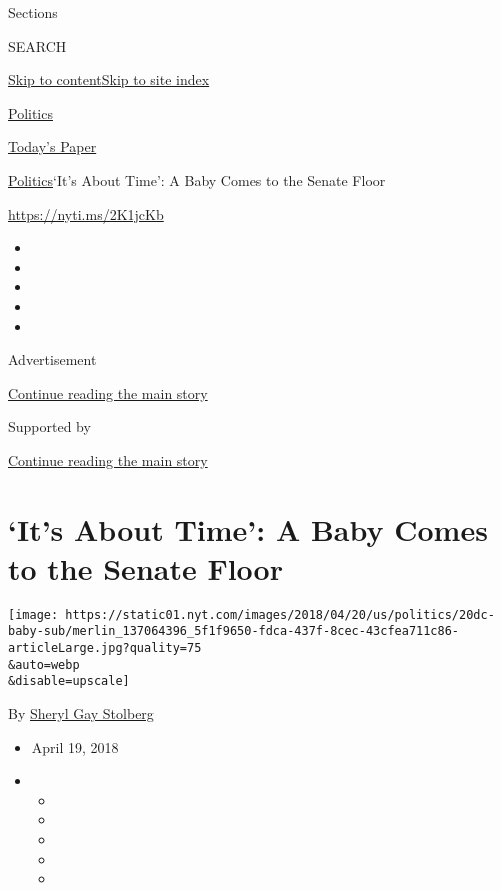 Sections

SEARCH

\protect\hyperlink{site-content}{Skip to
content}\protect\hyperlink{site-index}{Skip to site index}

\href{https://www.nytimes.com/section/politics}{Politics}

\href{https://myaccount.nytimes.com/auth/login?response_type=cookie\&client_id=vi}{}

\href{https://www.nytimes.com/section/todayspaper}{Today's Paper}

\href{/section/politics}{Politics}\textbar{}`It's About Time': A Baby
Comes to the Senate Floor

\url{https://nyti.ms/2K1jcKb}

\begin{itemize}
\item
\item
\item
\item
\item
\end{itemize}

Advertisement

\protect\hyperlink{after-top}{Continue reading the main story}

Supported by

\protect\hyperlink{after-sponsor}{Continue reading the main story}

\hypertarget{its-about-time-a-baby-comes-to-the-senate-floor}{%
\section{`It's About Time': A Baby Comes to the Senate
Floor}\label{its-about-time-a-baby-comes-to-the-senate-floor}}

\texttt{[image: https://static01.nyt.com/images/2018/04/20/us/politics/20dc-baby-sub/merlin\_137064396\_5f1f9650-fdca-437f-8cec-43cfea711c86-articleLarge.jpg?quality=75\\\&auto=webp\\\&disable=upscale]}

By \href{https://www.nytimes.com/by/sheryl-gay-stolberg}{Sheryl Gay
Stolberg}

\begin{itemize}
\item
  April 19, 2018
\item
  \begin{itemize}
  \item
  \item
  \item
  \item
  \item
  \end{itemize}
\end{itemize}

